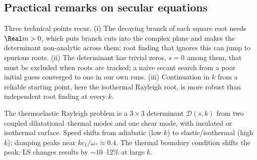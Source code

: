 \subsection{Practical remarks on secular equations}
Three technical points recur. (i) The decaying branch of each square root needs $\Real m>0$, which puts branch cuts into the complex plane and makes the determinant non-analytic across them; root finding that ignores this can jump to spurious roots. (ii) The determinant has trivial zeros, $s=0$ among them, that must be excluded when roots are tracked; a naive secant search from a poor initial guess converged to one in our own runs. (iii) Continuation in $k$ from a reliable starting point, here the isothermal Rayleigh root, is more robust than independent root finding at every $k$.

\begin{summarybox}[Summary]
The thermoelastic Rayleigh problem is a $3\times3$ determinant $\mathcal D(s,k)$ from two coupled dilatational--thermal modes and one shear mode, with insulated or isothermal surface. Speed shifts from adiabatic (low $k$) to elastic/isothermal (high $k$); damping peaks near $k c_1/\omega_*\approx0.4$. The thermal boundary condition shifts the peak; LS changes results by $\sim$10--12\% at large $k$.
\end{summarybox}
